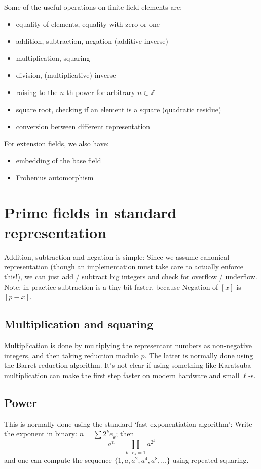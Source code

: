 \documentclass[12pt,draft,a4paper,openany,oneside]{amsbook}
\def\Z{\mathbb{Z}}
\theoremstyle{plain}
\theoremstyle{definition}
\begin{document}
Some of the useful operations on finite field elements are:
\begin{itemize}
\item equality of elements, equality with zero or one
\item addition, subtraction, negation (additive inverse)
\item multiplication, squaring
\item division, (multiplicative) inverse
\item raising to the $n$-th power for arbitrary $n\in\Z$
\item square root, checking if an element is a square (quadratic residue)
\item conversion between different representation\\
\end{itemize}

For extension fields, we also have:
\begin{itemize}
\item embedding of the base field
\item Frobenius automorphism
\end{itemize}


\section{Prime fields in standard representation}

Addition, subtraction and negation is simple: Since we assume canonical representation
(though an implementation must take care to actually enforce this!), we can
just add / subtract big integers and check for overflow / underflow. Note:
in practice subtraction is a tiny bit faster, because 
Negation of $[x]$ is $[p-x]$.

\subsection{Multiplication and squaring}
Multiplication is done by multiplying the representant numbers as non-negative 
integers, and then taking reduction modulo $p$.
The latter is normally done using the Barret reduction algorithm.
It's not clear if using something like Karatsuba multiplication can make
the first step faster on modern hardware and small $\ell$-s.

\subsection{Power}
This is normally done using the standard `fast exponentiation algorithm':
Write the exponent in binary: $n=\sum 2^k e_k$; then 
\[ a^n = \prod_{k\,:\,e_k=1} a^{2^{k}} \]
and one can compute the sequence $\{1,a,a^2,a^4,a^8,\dots\}$ using repeated
squaring.
\end{document}
